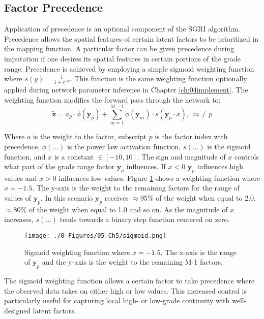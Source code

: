 \subsection{Factor Precedence}
\label{subsec:05precedence}

Application of precedence is an optional component of the \gls{SGRI} algorithm. Precedence allows the spatial features of certain latent factors to be prioritized in the mapping function. A particular factor can be given precedence during imputation if one desires its spatial features in certain portions of the grade range. Precedence is achieved by employing a simple sigmoid weighting function where $s(y) = \frac{1}{1+e^{-y}}$. This function is the same weighting function optionally applied during network parameter inference in Chapter \ref{ch:04implement}. The weighting function modifies the forward pass through the network to:
\begin{equation}
    \tilde{\mathbf{z}} = a_{p} \cdot \phi(\mathbf{y}_{p}) + \sum_{m=1}^{M-1} \phi(\mathbf{y}_{m}) \cdot s(\mathbf{y}_{p} \cdot x), \ \ m \neq p
    \label{eq:wtpass}
\end{equation}

Where $a$ is the weight to the factor, subscript $p$ is the factor index with precedence, $\phi(\dots)$ is the power law activation function, $s(\dots)$ is the sigmoid function, and $x$ is a constant $\in [-10, 10]$. The sign and magnitude of $x$ controls what part of the grade range factor $\mathbf{y}_{p}$ influences. If $x<0$ $\mathbf{y}_{p}$ influences high values and $x>0$ influences low values. Figure \ref{fig:sigmoid} shows a weighting function where $x=-1.5$. The y-axis is the weight to the remaining factors for the range of values of $\mathbf{y}_{p}$. In this scenario $\mathbf{y}_{p}$ receives $\approx 95\%$ of the weight when equal to 2.0, $\approx 80\%$ of the weight when equal to 1.0 and so on. As the magnitude of $x$ increases, $s(\dots)$ tends towards a binary step function centered on zero.

\begin{figure}[htb!]
    \centering
    \texttt{[image: ./0-Figures/05-Ch5/sigmoid.png]}
    \caption{Sigmoid weighting function where $x=-1.5$. The x-axis is the range of $\mathbf{y}_{p}$ and the y-axis is the weight to the remaining M-1 factors. }
    \label{fig:sigmoid}
\end{figure}

The sigmoid weighting function allows a certain factor to take precedence where the observed data takes on either high or low values. This increased control is particularly useful for capturing local high- or low-grade continuity with well-designed latent factors.

